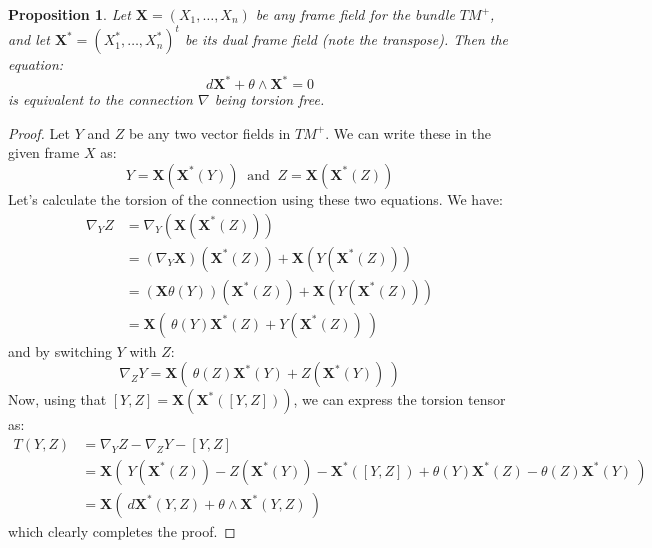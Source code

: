 \documentclass[11pt]{amsart}
\newtheorem{prop}[subsection]{Proposition}
\theoremstyle{definition}
\def \bldX{ \mathbf{X} }
\begin{document}
\begin{prop} Let $\bldX = (X_1, \ldots, X_n)$ be any frame field for the bundle $TM^{+}$, and let $\bldX^{\ast} = ( X_1^{\ast}, \ldots, X_n^{\ast} )^t$ be its dual frame field (note the transpose).  Then the equation:
%
$$ d \bldX^{\ast} + \theta \wedge \bldX^{\ast} = 0$$
%
is equivalent to the connection $\nabla$ being torsion free.
\end{prop}

\begin{proof}
%
Let $Y$ and $Z$ be any two vector fields in $TM^{+}$.  We can write these in the given frame $X$ as:
%
$$ Y = \bldX( \bldX^{\ast}(Y) ) \ \text{ and } \ Z = \bldX( \bldX^{\ast}(Z) ) $$
%
Let's calculate the torsion of the connection using these two equations.  We have:
%
\begin{align*}
\nabla_Y Z &= \nabla_Y ( \bldX( \bldX^{\ast}(Z) ) ) \\
&= (\nabla_Y \bldX) ( \bldX^{\ast}(Z) ) + \bldX( Y( \bldX^{\ast}(Z) ) ) \\
&= ( \bldX \theta(Y) ) ( \bldX^{\ast}(Z) ) + \bldX( Y( \bldX^{\ast}(Z) ) ) \\
&= \bldX( \ \theta(Y) \bldX^{\ast}(Z) + Y( \bldX^{\ast}(Z)) \ )
\end{align*}
%
and by switching $Y$ with $Z$:
%
$$ \nabla_Z Y = \bldX( \ \theta(Z) \bldX^{\ast}(Y) + Z( \bldX^{\ast}(Y)) \ ) $$
%
Now, using that $[Y,Z] = \bldX( \bldX^{\ast}( [Y,Z] ) )$, we can express the torsion tensor as:
%
\begin{align*}
T(Y,Z) &= \nabla_Y Z - \nabla_Z Y - [Y,Z] \\
&= \bldX( \ Y( \bldX^{\ast}(Z)) - Z( \bldX^{\ast}(Y)) - \bldX^{\ast}( [Y,Z] ) + \theta(Y) \bldX^{\ast}(Z) - \theta(Z) \bldX^{\ast}(Y) \ ) \\
&= \bldX( \ d \bldX^{\ast}(Y,Z) + \theta \wedge \bldX^{\ast} (Y,Z) \ )
\end{align*}
%
which clearly completes the proof.
%
\end{proof}
\end{document}
